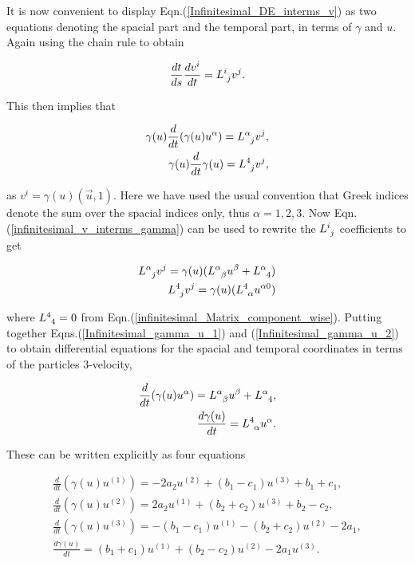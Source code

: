 \noindent It is now convenient to display Eqn.(\ref{Infinitesimal_DE_interms_v}) as two equations denoting the spacial part and the temporal part, in terms of $\gamma$ and $u$. Again using the chain rule to obtain

\begin{equation*} 
\frac{dt}{ds} \frac{dv^i}{dt} = \tensor{L}{^{i}_{j}}v^j. 
\end{equation*} 

\noindent This then implies that 

\begin{eqnarray}\label{Infinitesimal_gamma_u_1}
\gamma(u) \frac{d}{dt} (\gamma(u) u^{\alpha}) = \tensor{L}{^{\alpha}_{j}} v^j, \\\nonumber
\gamma(u) \frac{d}{dt} \gamma(u) = \tensor{L}{^{4}_{j}} v^j,
\end{eqnarray}

\noindent as $v^i = \gamma(u)(\vec{u},1)$. Here we have used the usual convention that Greek indices denote the sum over the spacial indices only, thus $\alpha = 1,2,3$. Now Eqn.(\ref{infinitesimal_v_interms_gamma}) can be used to rewrite the $\tensor{L}{^{i}_{j}}$ coefficients to get

\begin{eqnarray}\label{Infinitesimal_gamma_u_2}
\tensor{L}{^{\alpha}_{j}} v^j = \gamma(u) (\tensor{L}{^{\alpha}_{\beta}} u^{\beta} + \tensor{L}{^{\alpha}_4}) \\ \nonumber
\tensor{L}{^{4}_{j}} v^j = \gamma(u) (\tensor{L}{^{4}_{\alpha}} u^{\alpha0})
\end{eqnarray} 

\noindent where $\tensor{L}{^{4}_{4}} = 0$ from Eqn.(\ref{infinitesimal_Matrix_component_wise}). Putting together Eqns.(\ref{Infinitesimal_gamma_u_1}) and (\ref{Infinitesimal_gamma_u_2}) to obtain differential equations for the spacial and temporal coordinates in terms of the particles $3$-velocity,

\begin{eqnarray*} 
\frac{d}{dt} (\gamma(u) u^{\alpha}) = \tensor{L}{^{\alpha}_{\beta}} u^{\beta} + \tensor{L}{^{\alpha}_{4}}, \\
\frac{d\gamma(u)}{dt} = \tensor{L}{^{4}_{\alpha}} u^{\alpha}.
\end{eqnarray*} 

\noindent These can be written explicitly as four equations

\begin{eqnarray}\label{Infinitesimal_gamma_u_explicit_1}
\frac{d}{dt} (\gamma(u) u^{(1)}) = -2a_2u^{(2)} + (b_1 - c_1)u^{(3)} + b_1 + c_1, \\ \label{Infinitesimal_gamma_u_explicit_2}
\frac{d}{dt} (\gamma(u) u^{(2)}) = 2a_2 u^{(1)} + (b_2 + c_2) u^{(3)} + b_2 - c_2,\\ \label{Infinitesimal_gamma_u_explicit_3}
\frac{d}{dt} (\gamma(u) u^{(3)}) = -(b_1 - c_1) u^{(1)} - (b_2 + c_2 )u^{(2)} - 2a_1,\\ \label{Infinitesimal_gamma_u_explicit_4}
\frac{d\gamma(u)}{dt} = (b_1 + c_1)u^{(1)} + (b_2 - c_2) u^{(2)} - 2a_1 u^{(3)}.
\end{eqnarray}


